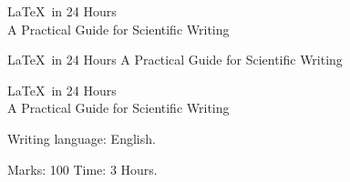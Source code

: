 \documentclass{article}
\begin{document}
\begin{center}
\LaTeX\ in 24 Hours\bigskip\\
A Practical Guide for Scientific Writing
\end{center} 

\begin{flushright}
    \LaTeX\ in 24 Hours
    \vskip 8mm
    A Practical Guide for Scientific Writing
\end{flushright}

\begin{flushleft}
    \LaTeX\ in 24 Hours
    \vspace{8mm}\\
    A Practical Guide for Scientific Writing
\end{flushleft}

\vskip 15mm
Writing language: \hspace{5mm} English.

\vskip 20mm
Marks: 100 \hfill Time: 3 Hours.
\end{document}

